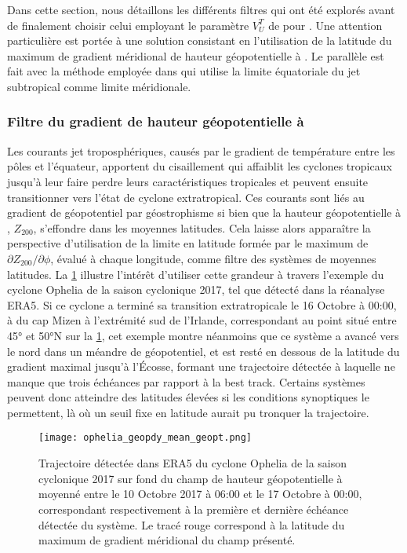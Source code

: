 \documentclass[../main.tex]{subfiles}
\begin{document}
Dans cette section, nous détaillons les différents filtres qui ont été explorés avant de finalement choisir celui employant le paramètre $V_U^T$ de
\citeauthor{hart_cyclone_2003} pour \textcite{dulac_assessing_2023}. Une attention particulière est portée à une solution consistant en l'utilisation de la
latitude du maximum de gradient méridional de hauteur géopotentielle à . Le parallèle est fait avec la méthode employée dans
\textcite{bourdin_intercomparison_2022} qui utilise la limite équatoriale du jet subtropical comme limite méridionale.

\subsubsection*{Filtre du gradient de hauteur géopotentielle à }

Les courants jet troposphériques, causés par le gradient de température entre les pôles et l'équateur, apportent du cisaillement qui affaiblit les cyclones
tropicaux jusqu'à leur faire perdre leurs caractéristiques tropicales et peuvent ensuite transitionner vers l'état de cyclone extratropical. Ces courants sont
liés au gradient de géopotentiel par géostrophisme si bien que la hauteur géopotentielle à , $Z_{200}$, s'effondre dans les moyennes latitudes. Cela
laisse alors apparaître la perspective d'utilisation de la limite en latitude formée par le maximum de $\partial Z_{200} / \partial \phi$, évalué à chaque
longitude, comme filtre des systèmes de moyennes latitudes. La \cref{fig:ophelia_z200} illustre l'intérêt d'utiliser cette grandeur à travers l'exemple du
cyclone Ophelia de la saison cyclonique 2017, tel que détecté dans la réanalyse ERA5. Si ce cyclone a terminé sa transition extratropicale le 16 Octobre à
00:00, à  du cap Mizen à l'extrémité sud de l'Irlande, correspondant au point situé entre \ang{45} et \ang{50}N sur la \cref{fig:ophelia_z200}, cet
exemple montre néanmoins que ce système a avancé vers le nord dans un méandre de géopotentiel, et est resté en dessous de la latitude du gradient maximal
jusqu'à l'Écosse, formant une trajectoire détectée à laquelle ne manque que trois échéances par rapport à la best track. Certains systèmes peuvent donc
atteindre des latitudes élevées si les conditions synoptiques le permettent, là où un seuil fixe en latitude aurait pu tronquer la trajectoire.

\begin{figure}[htpb]
    \centering
    \texttt{[image: ophelia\_geopdy\_mean\_geopt.png]}
    \caption{Trajectoire détectée dans ERA5 du cyclone Ophelia de la saison cyclonique 2017 sur fond du champ de hauteur géopotentielle à  moyenné
    entre le 10 Octobre 2017 à 06:00 et le 17 Octobre à 00:00, correspondant respectivement à la première et dernière échéance détectée du système. Le tracé
    rouge correspond à la latitude du maximum de gradient méridional du champ présenté.}
    \label{fig:ophelia_z200}
\end{figure}
\end{document}
